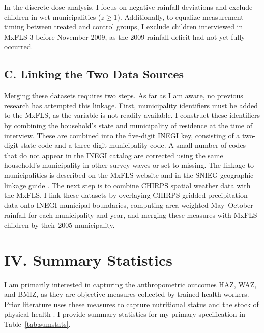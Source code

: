 In the discrete-dose analysis, I focus on negative rainfall deviations and exclude children in wet municipalities ($z \ge 1$). Additionally, to equalize measurement timing between treated and control groups, I exclude children interviewed in MxFLS-3 before November 2009, as the 2009 rainfall deficit had not yet fully occurred.

\subsection*{C. Linking the Two Data Sources}

Merging these datasets requires two steps. As far as I am aware, no previous research has attempted this linkage. First, municipality identifiers must be added to the MxFLS, as the variable is not readily available. I construct these identifiers by combining the household's state and municipality of residence at the time of interview. These are combined into the five-digit INEGI key, consisting of a two-digit state code and a three-digit municipality code. A small number of codes that do not appear in the INEGI catalog are corrected using the same household's municipality in other survey waves or set to missing. The linkage to municipalities is described on the MxFLS website and in the SNIEG geographic linkage guide \parencite{mxflsFrequentlyAskedQuestions,inegiGuiaParaVinculacion2025}. The next step is to combine CHIRPS spatial weather data with the MxFLS. I link these datasets by overlaying CHIRPS gridded precipitation data onto INEGI municipal boundaries, computing area-weighted May--October rainfall for each municipality and year, and merging these measures with MxFLS children by their 2005 municipality.

\section*{IV. Summary Statistics}\label{sec:IV}

I am primarily interested in capturing the anthropometric outcomes HAZ, WAZ, and BMIZ, as they are objective measures collected by trained health workers. Prior literature uses these measures to capture nutritional status and the stock of physical health \parencite{adairAgeSpecificDeterminantsStunting1997,hoddinottAdultConsequencesGrowth2013,gilesProtectingChildNutritional2015}. I provide summary statistics for my primary specification in Table~\ref{tab:sumstats}.


